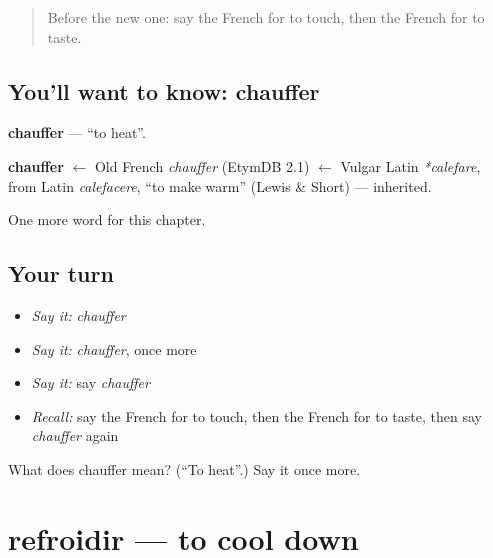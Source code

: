 \label{lesson:FR-C206-chauffer}



\begin{quote}
Before the new one: say the French for to touch, then the French for to taste.
\end{quote}

\subsection*{You'll want to know: chauffer}
\textbf{chauffer} — \textquotedblleft{}to heat\textquotedblright{}.

\begin{cousinweb}
\textbf{chauffer} $\leftarrow$ Old French \emph{chauffer} (EtymDB 2.1) $\leftarrow$ Vulgar Latin \emph{*calefare}, from Latin \emph{calefacere}, \textquotedblleft{}to make warm\textquotedblright{} (Lewis \& Short) — inherited.
\end{cousinweb}

\begin{grammarlens}[title={What you've built}]
One more word for this chapter.
\end{grammarlens}

\subsection*{Your turn}
\begin{itemize}
\raggedright
  \item \emph{Say it:} \emph{chauffer}
  \item \emph{Say it:} \emph{chauffer}, once more
  \item \emph{Say it:} say \emph{chauffer}
  \item \emph{Recall:} say the French for to touch, then the French for to taste, then say \emph{chauffer} again
\end{itemize}

\begin{tcolorbox}[breakable,colback=teal!4,colframe=teal!35!black,title={Before you move on}]
What does chauffer mean? (\textquotedblleft{}To heat\textquotedblright{}.) Say it once more.
\end{tcolorbox}
\section[refroidir]{refroidir — to cool down}

\label{lesson:FR-C206-refroidir}



